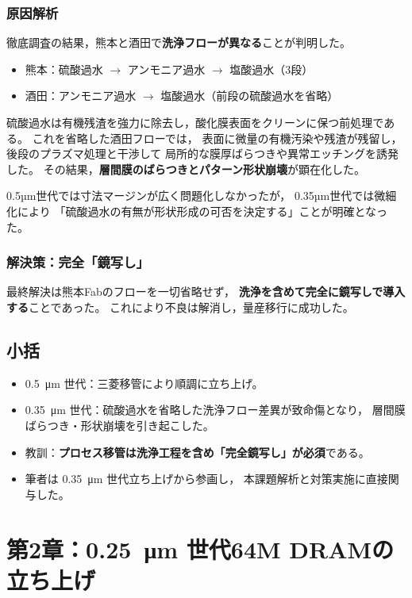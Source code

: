 \documentclass[conference]{IEEEtran}
\let\meter\metre
\begin{document}
\subsubsection*{原因解析}
徹底調査の結果，熊本と酒田で\textbf{洗浄フローが異なる}ことが判明した。
\begin{itemize}
  \item 熊本：硫酸過水 $\rightarrow$ アンモニア過水 $\rightarrow$ 塩酸過水（3段）
  \item 酒田：アンモニア過水 $\rightarrow$ 塩酸過水（前段の硫酸過水を省略）
\end{itemize}

硫酸過水は有機残渣を強力に除去し，酸化膜表面をクリーンに保つ前処理である。
これを省略した酒田フローでは，
表面に微量の有機汚染や残渣が残留し，
後段のプラズマ処理と干渉して
局所的な膜厚ばらつきや異常エッチングを誘発した。
その結果，\textbf{層間膜のばらつきとパターン形状崩壊}が顕在化した。

0.5µm世代では寸法マージンが広く問題化しなかったが，
0.35µm世代では微細化により
「硫酸過水の有無が形状形成の可否を決定する」ことが明確となった。

\subsubsection*{解決策：完全「鏡写し」}
最終解決は熊本Fabのフローを一切省略せず，
\textbf{洗浄を含めて完全に鏡写しで導入する}ことであった。
これにより不良は解消し，量産移行に成功した。

\subsection{小括}
\begin{itemize}
  \item \SI{0.5}{\micro\meter} 世代：三菱移管により順調に立ち上げ。
  \item \SI{0.35}{\micro\meter} 世代：硫酸過水を省略した洗浄フロー差異が致命傷となり，
        層間膜ばらつき・形状崩壊を引き起こした。
  \item 教訓：\textbf{プロセス移管は洗浄工程を含め「完全鏡写し」が必須}である。
  \item 筆者は \SI{0.35}{\micro\meter} 世代立ち上げから参画し，
        本課題解析と対策実施に直接関与した。
\end{itemize}

\section{第2章：\texorpdfstring{\SI{0.25}{\micro\meter}}{0.25µm} 世代64M DRAMの立ち上げ}
\end{document}
